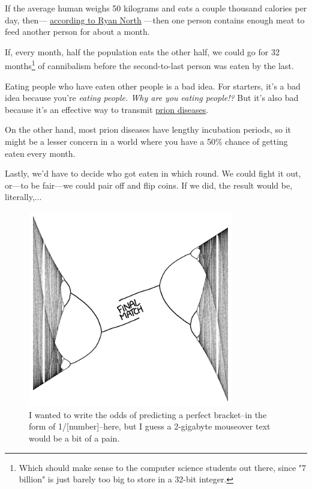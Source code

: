 {{If the average human weighs 50 kilograms and eats a couple thousand calories per day, then— \href{http://www.topatoco.com/merchant.mvc?Screen=PROD&Store\_Code=TO&Product\_Code=QW-PERSON&Category\_Code=QW}{according to Ryan North} —then one person contains enough meat to feed another person for about a month.}

{If, every month, half the population eats the other half, we could go for 32 months{\footnote{Which should make sense to the computer science students out there, since "7 billion" is just barely too big to store in a 32-bit integer.} } of cannibalism before the second-to-last person was eaten by the last.}

{Eating people who have eaten other people is a bad idea. For starters, it's a bad idea because you're \emph{eating people. Why are you eating people!?} But it's also bad because it's an effective way to transmit \href{http://www.cdc.gov/ncidod/dvrd/prions/}{prion diseases}.}

{On the other hand, most prion diseases have lengthy incubation periods, so it might be a lesser concern in a world where you have a 50\% chance of getting eaten every month.}

{Lastly, we'd have to decide who got eaten in which round. We could fight it out, or—to be fair—we could pair off and flip coins. If we did, the result would be, literally,...}

\begin{figure}[!htbp]
\centering
\includegraphics[scale=0.5, max width=0.8\textwidth]{imgs/a/105/bracket.png}
\caption{I wanted to write the odds of predicting a perfect bracket--in the form of 1/[number]--here, but I guess a 2-gigabyte mouseover text would be a bit of a pain.}
\end{figure}

}
